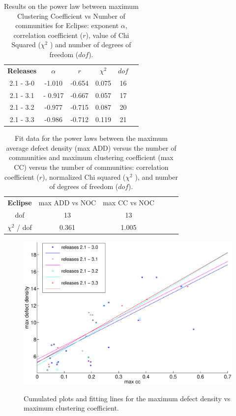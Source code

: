 \begin{table}%
\centering
\begin{tabular}{|c|c|c|c|c|c|}
\hline
\textbf{Releases} & $\alpha$ & $r$ & $\chi^2$ & $dof$  \\
      2.1 - 3-0   & -1.010  & -0.654 &  0.075 & 16 	 \\
      2.1 - 3.1   & - 0.917 & -0.667 &  0.057 & 17 	 \\ 
      2.1 - 3.2   & -0.977  & -0.715 &  0.087 & 20	 \\ 
      2.1 - 3.3   & -0.986  & -0.712 &  0.119 & 21	 \\
\hline
\end{tabular}
\caption{Results on the power law between maximum Clustering Coefficient vs Number of communities for Eclipse: exponent $\alpha$, 
correlation coefficient ($r$), value of Chi Squared ($\chi^2$ ) and number of degrees of freedom ($dof$). 
}
\label{tab:log-log-cc-noc}
\end{table}
\begin{table}
\centering
          \begin{tabular}{|c|c|c|c|c|c|}
	\hline
	\textbf{Eclipse} & max ADD vs NOC & max CC vs NOC \\ 	
		     dof & 13 & 13 \\
		    $\chi^2$ / dof & 0.361 & 1.005 \\ \hline
	      \end{tabular}
\caption{Fit data for the power laws between the maximum average defect density (max ADD) versus the number of communities
and maximum clustering coefficient (max CC) versus the number of communities: correlation coefficient ($r$), 
      normalized Chi squared ($\chi^2$ ), and number of degrees of freedom ($dof$).}
\label{tab:lin-fit-cc-and-add}
\end{table}

\begin{figure}[!htbp]
     \centering
    \includegraphics[width=\textwidth]{figure/nuovefig/cumulated_bug_cc_EC.eps}
    \label{cumulated_bug_cc_EC}
    \caption{Cumulated plots and fitting lines for the maximum defect density vs maximum clustering coefficient.}
\end{figure}

